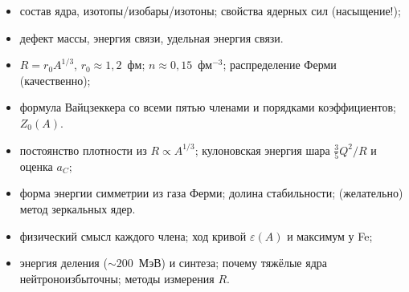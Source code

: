 \begin{examcheck}
\begin{itemize}
 \item состав ядра, изотопы/изобары/изотоны; свойства ядерных сил (насыщение!);
 \item дефект массы, энергия связи, удельная энергия связи.
\end{itemize}
\begin{itemize}
 \item $R=r_0A^{1/3}$, $r_0\approx1{,}2$~фм; $n\approx0{,}15$~фм$^{-3}$; распределение Ферми (качественно);
 \item формула Вайцзеккера со всеми пятью членами и порядками коэффициентов; $Z_0(A)$.
\end{itemize}
\begin{itemize}
 \item постоянство плотности из $R\propto A^{1/3}$; кулоновская энергия шара $\frac35Q^2/R$ и оценка $a_C$;
 \item форма энергии симметрии из газа Ферми; долина стабильности; (желательно) метод зеркальных ядер.
\end{itemize}
\begin{itemize}
 \item физический смысл каждого члена; ход кривой $\varepsilon(A)$ и максимум у Fe;
 \item энергия деления ($\sim200$~МэВ) и синтеза; почему тяжёлые ядра нейтроноизбыточны; методы измерения $R$.
\end{itemize}
\end{examcheck}
